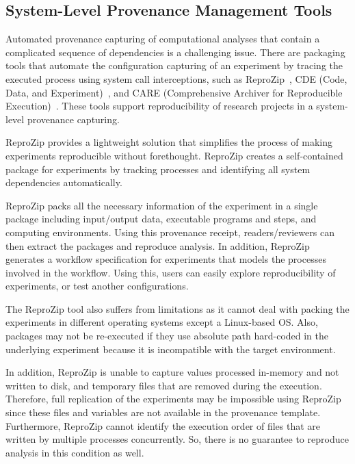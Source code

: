 \subsection{System-Level Provenance Management Tools}

Automated provenance capturing of computational analyses that 
contain a complicated sequence of dependencies is a challenging issue. 
There are packaging tools that automate the configuration capturing of 
an experiment by tracing the executed process using system call 
interceptions, such as ReproZip~\cite{chirigati2016reprozip}, CDE 
(Code, Data, and Experiment)~\cite{guo2012cde}, and CARE (Comprehensive 
Archiver for Reproducible Execution)~\cite{janin2014care}. These tools 
support reproducibility of research projects in a system-level 
provenance capturing. 

ReproZip provides a lightweight solution 
that simplifies the process of making experiments reproducible without 
forethought. ReproZip creates a self-contained package for experiments 
by tracking processes and identifying all system dependencies 
automatically. 

ReproZip packs all the necessary information of the experiment in a 
single package including input/output data, executable programs and 
steps, and computing environments. Using this provenance receipt, 
readers/reviewers can then extract the packages and reproduce analysis. 
In addition, ReproZip generates a workflow specification for 
experiments that models the processes involved in the workflow. Using 
this, users can easily explore reproducibility of experiments, or test 
another configurations. 

The ReproZip tool also suffers from limitations as it cannot deal with 
packing the experiments in different operating systems except a 
Linux-based OS. Also, packages may not be re-executed if they use 
absolute path hard-coded in the underlying experiment because it 
is incompatible with the target environment. 

In addition, ReproZip is unable to capture values processed in-memory 
and not written to disk, and temporary files that are removed 
during the execution. Therefore, full replication of the experiments 
may be impossible using ReproZip since these files and variables are 
not available in the provenance template. 
Furthermore, ReproZip cannot 
identify the execution order of files that are written by multiple 
processes concurrently. So, there is no guarantee to reproduce analysis 
in this condition as well.

